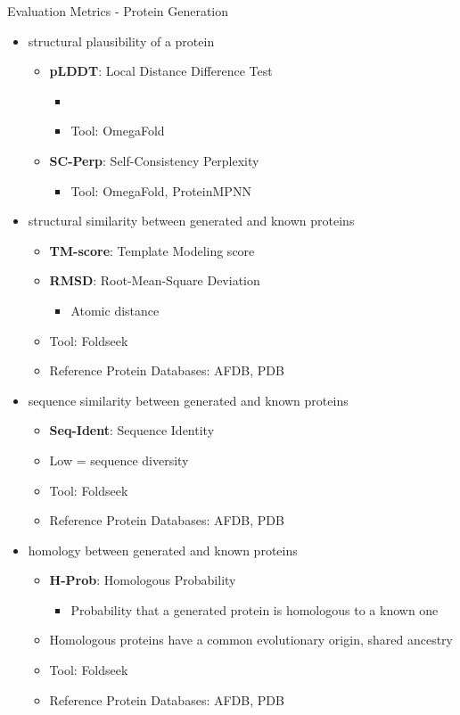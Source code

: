 \begin{frame}[shrink=10]{Evaluation Metrics - Protein Generation}
	\begin{itemize}\setlength\itemsep{2em}
		\item structural plausibility of a protein
		\begin{itemize}
			\item \textbf{pLDDT}: Local Distance Difference Test~\cite{jumper2021highly}
			\begin{itemize}
				\item {}
				\item Tool: OmegaFold
			\end{itemize}
			\item \textbf{SC-Perp}: Self-Consistency Perplexity~\cite{alamdari2023protein}
			\begin{itemize}
				\item Tool: OmegaFold, ProteinMPNN
			\end{itemize}
		\end{itemize}
		\item structural similarity between generated and known proteins
		\begin{itemize}
			\item \textbf{TM-score}: Template Modeling score~\cite{zhang2004scoring}
			\item \textbf{RMSD}:  Root-Mean-Square Deviation
			\begin{itemize}
				\item Atomic distance
			\end{itemize}
			\item Tool: Foldseek
			\item Reference Protein Databases: AFDB, PDB
		\end{itemize}
		\item sequence similarity between generated and known proteins
		\begin{itemize}
			\item \textbf{Seq-Ident}: Sequence Identity
			\item Low = sequence diversity
			\item Tool: Foldseek
			\item Reference Protein Databases: AFDB, PDB
		\end{itemize}
		\item homology between generated and known proteins
		\begin{itemize}
			\item \textbf{H-Prob}: Homologous Probability
			\begin{itemize}
				\item Probability that a generated protein is homologous to a known one
			\end{itemize}
			\item Homologous proteins have a common evolutionary origin, shared ancestry
			\item Tool: Foldseek
			\item Reference Protein Databases: AFDB, PDB
		\end{itemize}
	\end{itemize}
\end{frame}